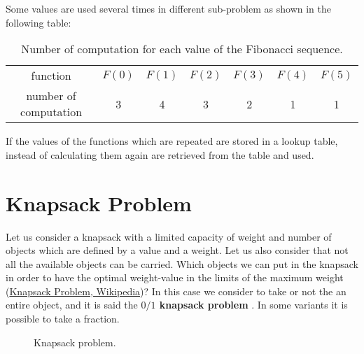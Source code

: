 Some values are used several times in different sub-problem as shown in the following table:
\begin{table}[H]
	\centering
	\begin{tabular}{c c c c c c c}
	function & $F(0)$ & $F(1)$ & $F(2)$ & $F(3)$ & $F(4)$ & $F(5)$ \\
	number of computation & 3 & 4 & 3 & 2 & 1 & 1
	\end{tabular}
	\caption[Number of computation for each value of the Fibonacci sequence.]{Number of computation for each value of the Fibonacci sequence.}
\end{table}
If the values of the functions which are repeated are stored in a lookup table, instead of calculating them again are retrieved from the table and used.

\section{Knapsack Problem}
Let us consider a knapsack with a limited capacity of weight and number of objects which are defined by a value and a weight. Let us also consider that not all the available objects can be carried. Which objects we can put in the knapsack in order to have the optimal weight-value in the limits of the maximum weight \cite{wikiknapsackproblem}(\href{https://en.wikipedia.org/wiki/Knapsack_problem}{Knapsack Problem, Wikipedia})? In this case we consider to take or not the an entire object, and it is said the \textbf{\(0/1\) knapsack problem} . In some variants it is possible to take a fraction.

\begin{figure}[H]
\centering
{}
\caption[Knapsack problem.]{Knapsack problem.}
\end{figure}

